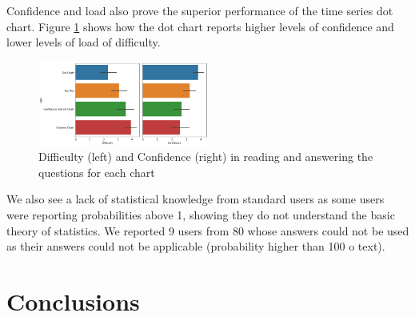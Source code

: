 \documentclass[a4paper,3p,sort&compress]{elsarticle}
\begin{document}
Confidence and load also prove the superior performance of the time series dot chart. Figure \ref{figure:confi_load} shows how the dot chart reports higher levels of confidence and lower levels of load of difficulty.

\begin{figure}
  \centering
   \includegraphics[width=0.5\textwidth]{confi_load}
  \caption{\label{figure:confi_load} Difficulty (left) and Confidence (right) in reading and answering the questions for each chart}
\end{figure}

We also see a lack of statistical knowledge from standard users as some users were reporting probabilities above 1, showing they do not understand the basic theory of statistics. We reported 9 users from 80 whose answers could not be used as their answers could not be applicable (probability higher than 100 o text).

\section{Conclusions}
\label{sec:concl}


\end{document}
